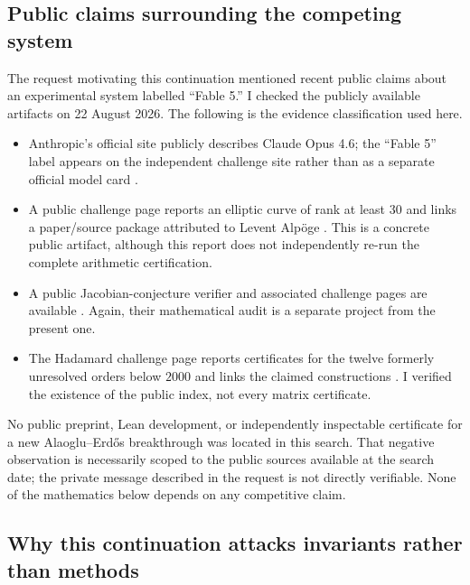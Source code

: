 \documentclass[11pt,oneside]{article}
\theoremstyle{research}
\theoremstyle{definition}
\begin{document}
\subsection{Public claims surrounding the competing system}

The request motivating this continuation mentioned recent public claims about
an experimental system labelled ``Fable 5.''  I checked the publicly available
artifacts on 22 August 2026.  The following is the evidence classification used
here.

\begin{itemize}[leftmargin=2em]
\item Anthropic's official site publicly describes Claude Opus 4.6; the
      ``Fable 5'' label appears on the independent challenge site rather than
      as a separate official model card \cite{AnthropicOpus46,ByClaudeHome}.
\item A public challenge page reports an elliptic curve of rank at least $30$
      and links a paper/source package attributed to Levent Alp\"oge
      \cite{ByClaudeRank30}.  This is a concrete public artifact, although this
      report does not independently re-run the complete arithmetic
      certification.
\item A public Jacobian-conjecture verifier and associated challenge pages are
      available \cite{JacobianVerifier,ByClaudeJacobian}.  Again, their
      mathematical audit is a separate project from the present one.
\item The Hadamard challenge page reports certificates for the twelve formerly
      unresolved orders below $2000$ and links the claimed constructions
      \cite{ByClaudeHadamard}.  I verified the existence of the public index,
      not every matrix certificate.
\end{itemize}

No public preprint, Lean development, or independently inspectable certificate
for a new Alaoglu--Erdős breakthrough was located in this search.  That
negative observation is necessarily scoped to the public sources available at
the search date; the private message described in the request is not directly
verifiable.  None of the mathematics below depends on any competitive claim.

\subsection{Why this continuation attacks invariants rather than methods}
\end{document}
